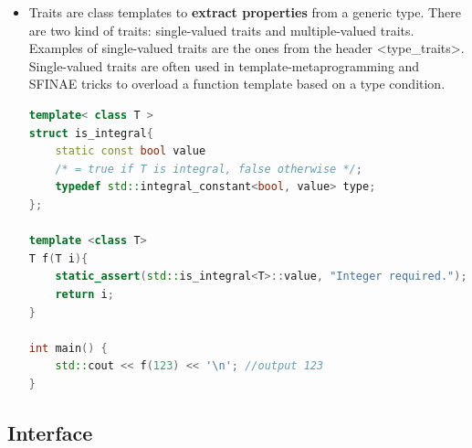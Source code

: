 \documentclass[a4paper,11pt,twoside]{book}
\begin{document}
\begin{itemize}
	\item Traits are class templates to \textbf{extract properties} from a generic type. There are two kind of traits: single-valued traits and multiple-valued traits. Examples of single-valued traits are the ones from the header <type\_traits>. Single-valued traits are often used in template-metaprogramming and SFINAE tricks to overload a function template based on a type condition.
	\begin{lstlisting}[frame=single, language=c++]
template< class T >
struct is_integral{
	static const bool value
	/* = true if T is integral, false otherwise */;
	typedef std::integral_constant<bool, value> type;
};
	
template <class T>
T f(T i){
	static_assert(std::is_integral<T>::value, "Integer required.");
	return i;
}

int main() {
	std::cout << f(123) << '\n'; //output 123
}
\end{lstlisting}
\end{itemize}
\subsection{Interface}
\end{document}
